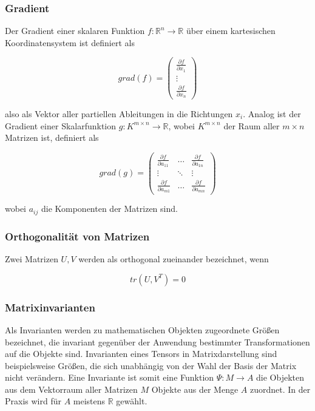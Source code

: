 \documentclass[a4paper,fontsize=12pt,toc=bib,halfparskip]{scrartcl}
\begin{document}
\subsubsection{Gradient}
Der Gradient einer skalaren Funktion $f: \mathbb{R}^n \rightarrow \mathbb{R}$  \"uber einem kartesischen Koordinatensystem ist definiert als

\begin{equation}
	grad(f) = 	
	\begin{pmatrix}
		\frac{\partial f}{\partial x_1} \\
		\vdots \\
		\frac{\partial f}{\partial x_n}
	\end{pmatrix}
\end{equation}

also als Vektor aller partiellen Ableitungen in die Richtungen $x_i$. Analog ist der Gradient einer Skalarfunktion $g: K^{m\times n} \rightarrow \mathbb{R}$, wobei $K^{m\times n}$ der Raum aller $m\times n$ Matrizen ist, definiert als

\begin{equation}
	grad(g) =
	\begin{pmatrix}
		\frac{\partial f}{\partial a_{11}} & \dots & \frac{\partial f}{\partial a_{1n}}  \\
		\vdots & \ddots & \vdots \\
		\frac{\partial f}{\partial a_{m1}} & \dots & \frac{\partial f}{\partial a_{mn}} 
	\end{pmatrix}
\end{equation}

wobei $a_{ij}$ die Komponenten der Matrizen sind.

\subsubsection{Orthogonalit\"at von Matrizen}
Zwei Matrizen $U,V$ werden als orthogonal zueinander bezeichnet, wenn \cite{ennis2006orthogonal}

\begin{equation}
tr(U,V^{T}) = 0
\end{equation}

\subsubsection{Matrixinvarianten}
\label{Matrixinvarianten}
Als Invarianten werden zu mathematischen Objekten zugeordnete Gr\"o{\ss}en bezeichnet, die invariant gegen\"uber der Anwendung bestimmter Transformationen auf die Objekte sind. Invarianten eines Tensors in Matrixdarstellung sind beispielsweise Gr\"o{\ss}en, die sich unabh\"angig von der Wahl der Basis der Matrix nicht ver\"andern\cite{ennis2006orthogonal}. Eine Invariante ist somit eine Funktion $\Psi: M \rightarrow A$ die Objekten aus dem Vektorraum aller Matrizen $M$ Objekte aus der Menge $A$ zuordnet. In der Praxis wird f\"ur $A$ meistens $\mathbb{R}$ gew\"ahlt.
\end{document}
